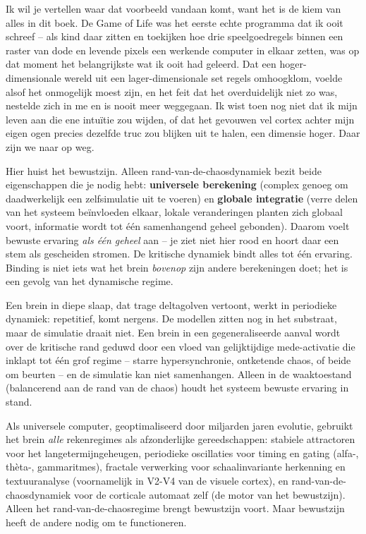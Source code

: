 \documentclass[11pt, twoside, openright]{book}
\begin{document}
Ik wil je vertellen waar dat voorbeeld vandaan komt, want het is de kiem van alles in dit boek. De Game of Life was het eerste echte programma dat ik ooit schreef -- als kind daar zitten en toekijken hoe drie speelgoedregels binnen een raster van dode en levende pixels een werkende computer in elkaar zetten, was op dat moment het belangrijkste wat ik ooit had geleerd. Dat een hoger-dimensionale wereld uit een lager-dimensionale set regels omhoogklom, voelde alsof het onmogelijk moest zijn, en het feit dat het overduidelijk niet zo was, nestelde zich in me en is nooit meer weggegaan. Ik wist toen nog niet dat ik mijn leven aan die ene intuïtie zou wijden, of dat het gevouwen vel cortex achter mijn eigen ogen precies dezelfde truc zou blijken uit te halen, een dimensie hoger. Daar zijn we naar op weg.

Hier huist het bewustzijn. Alleen rand-van-de-chaosdynamiek bezit beide eigenschappen die je nodig hebt: \textbf{universele berekening} (complex genoeg om daadwerkelijk een zelfsimulatie uit te voeren) en \textbf{globale integratie} (verre delen van het systeem beïnvloeden elkaar, lokale veranderingen planten zich globaal voort, informatie wordt tot één samenhangend geheel gebonden). Daarom voelt bewuste ervaring \textit{als één geheel} aan -- je ziet niet hier rood en hoort daar een stem als gescheiden stromen. De kritische dynamiek bindt alles tot één ervaring. Binding is niet iets wat het brein \textit{bovenop} zijn andere berekeningen doet; het is een gevolg van het dynamische regime.

Een brein in diepe slaap, dat trage deltagolven vertoont, werkt in periodieke dynamiek: repetitief, komt nergens. De modellen zitten nog in het substraat, maar de simulatie draait niet. Een brein in een gegeneraliseerde aanval wordt over de kritische rand geduwd door een vloed van gelijktijdige mede-activatie die inklapt tot één grof regime -- starre hypersynchronie, ontketende chaos, of beide om beurten -- en de simulatie kan niet samenhangen. Alleen in de waaktoestand (balancerend aan de rand van de chaos) houdt het systeem bewuste ervaring in stand.

Als universele computer, geoptimaliseerd door miljarden jaren evolutie, gebruikt het brein \textit{alle} rekenregimes als afzonderlijke gereedschappen: stabiele attractoren voor het langetermijngeheugen, periodieke oscillaties voor timing en gating (alfa-, thèta-, gammaritmes), fractale verwerking voor schaalinvariante herkenning en textuuranalyse (voornamelijk in V2-V4 van de visuele cortex), en rand-van-de-chaosdynamiek voor de corticale automaat zelf (de motor van het bewustzijn). Alleen het rand-van-de-chaosregime brengt bewustzijn voort. Maar bewustzijn heeft de andere nodig om te functioneren.
\end{document}
